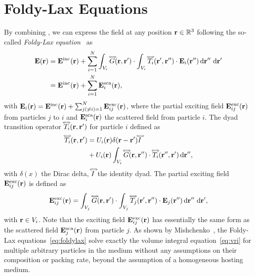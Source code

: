 \section{Foldy-Lax Equations}
\label{sec:foldylax}
%
By combining , we can express the field at any position $\mathbf{r}\in\mathbb{R}^3$ following the so-called \emph{Foldy-Lax equation}~\cite{foldy1945multiple,lax1951multiple} as
\begin{align}
\mathbf{E}(\mathbf{r})& = \mathbf{E}^\text{inc}(\mathbf{r}) + \sum_{i=1}^N \int_{V_i} \accentset{\Longleftrightarrow}{G}(\mathbf{r},\mathbf{r}') \cdot \int_{V_i} \accentset{\Longleftrightarrow}{T}_i(\mathbf{r}',\mathbf{r}'') \cdot \mathbf{E}_i(\mathbf{r}'') \,\text{d}\mathbf{r}''\,\,\text{d}\mathbf{r}' \nonumber \\
&=\mathbf{E}^\text{inc}(\mathbf{r})+\sum_{i=1}^N \mathbf{E}^\text{sca}_i(\mathbf{r}),
\label{eq:foldylax}
\end{align}
%
with $\mathbf{E}_i(\mathbf{r})=\mathbf{E}^\text{inc}(\mathbf{r}) + \sum_{j(\neq i)=1}^N \mathbf{E}^\text{exc}_{ij}(\mathbf{r})$, where the partial exciting field $\mathbf{E}^\text{exc}_{ij}(\mathbf{r})$ from particles $j$ to $i$ and $\mathbf{E}^\text{sca}_i(\mathbf{r})$ the scattered field from particle $i$. The dyad transition operator $\accentset{\Longleftrightarrow}{T}_i(\mathbf{r},\mathbf{r}')$ for particle $i$ defined as~\cite{tsang1985theory}
\begin{align}
\accentset{\Longleftrightarrow}{T}_i(\mathbf{r},\mathbf{r}') & = U_i(\mathbf{r}) \delta(\mathbf{r}-\mathbf{r}')\accentset{\Longleftrightarrow}{I}   \nonumber
\\
& +U_i(\mathbf{r}) \int_{V_i} \accentset{\Longleftrightarrow}{G}(\mathbf{r},\mathbf{r}'') \cdot \accentset{\Longleftrightarrow}{T}_i(\mathbf{r}'',\mathbf{r}') \,\text{d}\mathbf{r}'',
\end{align}
with $\delta(x)$ the Dirac delta, $\accentset{\Longleftrightarrow}{I}$ the identity dyad. The partial exciting field $\mathbf{E}^\text{exc}_{ij}(\mathbf{r})$ is defined as
\begin{equation}
\mathbf{E}^\text{exc}_{ij}(\mathbf{r}) = \int_{V_j} \accentset{\Longleftrightarrow}{G}(\mathbf{r},\mathbf{r}') \cdot \int_{V_j} \accentset{\Longleftrightarrow}{T}_j(\mathbf{r}',\mathbf{r}'') \cdot \mathbf{E}_j(\mathbf{r}'') \,\text{d}\mathbf{r}''\,\,\text{d}\mathbf{r}', 
\label{eq:excfield}
\end{equation}
%
with $\mathbf{r}\in V_i$. Note that the exciting field $\mathbf{E}^\text{exc}_{ij}(\mathbf{r})$ has essentially the same form as the scattered field $\mathbf{E}^\text{sca}_j(\mathbf{r})$ from particle $j$. As shown by Mishchenko~, the Foldy-Lax equations~\eqref{eq:foldylax} solve exactly the volume integral equation~\eqref{eq:vri} for multiple arbitrary particles in the medium without any assumptions on their composition or packing rate, beyond the assumption of a homogeneous hosting medium. 






